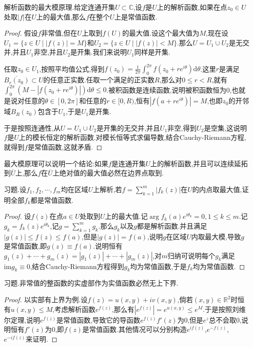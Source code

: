 解析函数的最大模原理.给定连通开集$U\subset\mathbb{C}$,设$f$是$U$上的解析函数,如果在点$z_0\in U$处取$|f|$在$U$上的最大值,那么$f$在整个$U$上是常值函数.
\begin{proof}
	
	假设$f$非常值,但在$U$上取到$f(U)$的最大值.设这个最大值为$M$,现在设$U_1=\{z\in U\mid |f(z)|=M\}$和$U_2=\{z\in U\mid |f(z)|<M\}$.那么$U=U_1\cup U_2$是无交并,并且$U_1$非空,并且$U_2$是开集.我们来说明$U_1$同样是开集.
	
	任取$z_0\in U_1$,按照平均值公式,得到$f(z_0)=\frac{1}{2\pi}\int_0^{2\pi}f(z_0+re^{i\theta})\mathrm{d}\theta$.这里$r$是满足$\overline{B_r(z_0)}\subset U$的任意正实数.任取一个满足的正实数$R$,那么对$0\le r<R$,就有$\int_0^{2\pi}\left(M-|f(z_0+re^{i\theta})|\right)\mathrm{d}\theta\le0$.被积函数是连续函数,说明被积函数恒为0,也就是说对任意的$\theta\in[0,2\pi]$和任意的$r\in[0,R)$,恒有$|f(a+re^{i\theta})|=M$,也即$z_0$的开邻域$B_{R}(z_0)$包含于$U_1$,于是$U_1$是开集.
	
	于是按照连通性,从$U=U_1\cup U_2$是开集的无交并,并且$U_1$非空,得到$U_2$是空集,这说明$f$是$U$上的模长恒定的解析函数.对模长恒等式求偏导数,结合Cauchy-Riemann方程,就得到$f$是常值函数,这就矛盾.
\end{proof}

最大模原理可以说明一个结论:如果$f$是连通开集$U$上的解析函数,并且可以连续延拓到$\overline{U}$上,那么$f$在$\overline{U}$上绝对值的最大值必然在边界点取到.

习题.设$f_1,f_2,\cdots,f_m$均在区域$U$上解析,若$f=\sum_{k=1}^m|f_k(z)|$在$U$的内点取最大值,证明全部$f_k$都是常值函数.
\begin{proof}
	
	设$f(z)$在点$a\in U$处取到$U$上的最大值.记$\arg f_k(a)e^{i\theta_k}=0,1\le k\le m$.记$g_k=f_k(z)e^{i\theta_k}$,记$g=\sum_{k=1}^mg_k$.那么$g_k$以及$g$都是解析函数.并且满足$|g(z)|\le f(z)\le f(a)$,但是$|g(z)|=f(a)$,说明$g$在区域$U$内取最大模,导致$g$是常值函数,即$g(z)\equiv f(a)$.说明恒有$g_1(z)+\cdots+g_m(z)=|g_1(z)|+\cdots+|g_m(z)|$,对$m$归纳可说明每个$g_k$满足$\mathrm{im}g_k\equiv0$,结合Cauchy-Riemann方程得到$g_k$均为常值函数,于是$f_k$均为常值函数.
\end{proof}

习题.非常值的整函数的实虚部作为实值函数必然无上下界.
\begin{proof}
	
	以实部有上界为例.设$f(z)=u(x,y)+iv(x,y)$,倘若$(x,y)\in\mathbb{R}^2$时恒有$u(x,y)\le M$,考虑解析函数$e^{f(z)}$,那么有$|e^{f(z)}|=e^{u(x,y)}\le e^{M}$.于是按照刘维尔定理,说明$e^{f(z)}$是常值函数,导致它的导函数$e^{f(z)}f'(z)$为0,但是$e^{z}$总不会取0,说明恒有$f'(z)$为0,即$f(z)$是常值函数.其他情况可以分别构造$e^{if(z)}$,$e^{-f(z)}$,$e^{-if(z)}$来证明.
\end{proof}

